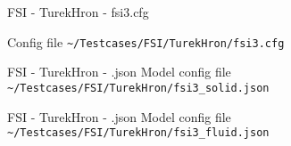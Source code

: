 \begin{frame}{FSI - TurekHron - fsi3.cfg}

Config file \lstinline{~/Testcases/FSI/TurekHron/fsi3.cfg}

\vspace{5mm}


\end{frame}


\begin{frame}{FSI - TurekHron - .json}
Model config file \lstinline{~/Testcases/FSI/TurekHron/fsi3_solid.json}
\vspace{5mm}


\end{frame}


\begin{frame}{FSI - TurekHron - .json}
Model config file \lstinline{~/Testcases/FSI/TurekHron/fsi3_fluid.json}
\vspace{5mm}


\end{frame}







